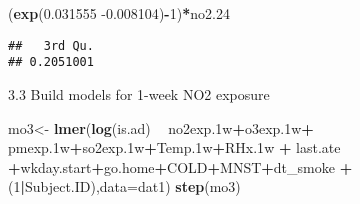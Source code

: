 \documentclass[12pt,]{article}
\newenvironment{Shaded}{\begin{snugshade}}{\end{snugshade}}
\newcommand{\DataTypeTok}[1]{\textcolor[rgb]{0.13,0.29,0.53}{#1}}
\newcommand{\DecValTok}[1]{\textcolor[rgb]{0.00,0.00,0.81}{#1}}
\newcommand{\FloatTok}[1]{\textcolor[rgb]{0.00,0.00,0.81}{#1}}
\newcommand{\KeywordTok}[1]{\textcolor[rgb]{0.13,0.29,0.53}{\textbf{#1}}}
\newcommand{\NormalTok}[1]{#1}
\newcommand{\OperatorTok}[1]{\textcolor[rgb]{0.81,0.36,0.00}{\textbf{#1}}}
\newcommand{\StringTok}[1]{\textcolor[rgb]{0.31,0.60,0.02}{#1}}
\begin{document}
\begin{Shaded}
\begin{Highlighting}[]
\NormalTok{(}\KeywordTok{exp}\NormalTok{(}\FloatTok{0.031555} \FloatTok{-0.008104}\NormalTok{)}\OperatorTok{-}\DecValTok{1}\NormalTok{)}\OperatorTok{*}\NormalTok{no2}\FloatTok{.24}
\end{Highlighting}
\end{Shaded}

\begin{verbatim}
##   3rd Qu. 
## 0.2051001
\end{verbatim}

3.3 Build models for 1-week NO2 exposure

\begin{Shaded}
\begin{Highlighting}[]
\NormalTok{mo3<-}\StringTok{ }\KeywordTok{lmer}\NormalTok{(}\KeywordTok{log}\NormalTok{(is.ad) }\OperatorTok{~}\StringTok{ }\NormalTok{no2exp}\FloatTok{.1}\NormalTok{w}\OperatorTok{+}\NormalTok{o3exp}\FloatTok{.1}\NormalTok{w}\OperatorTok{+}\StringTok{ }\NormalTok{pmexp}\FloatTok{.1}\NormalTok{w}\OperatorTok{+}\NormalTok{so2exp}\FloatTok{.1}\NormalTok{w}\OperatorTok{+}\NormalTok{Temp}\FloatTok{.1}\NormalTok{w}\OperatorTok{+}\NormalTok{RHx}\FloatTok{.1}\NormalTok{w }\OperatorTok{+}\StringTok{ }\NormalTok{last.ate }\OperatorTok{+}\NormalTok{wkday.start}\OperatorTok{+}\NormalTok{go.home}\OperatorTok{+}\NormalTok{COLD}\OperatorTok{+}\NormalTok{MNST}\OperatorTok{+}\NormalTok{dt_smoke }\OperatorTok{+}\NormalTok{(}\DecValTok{1}\OperatorTok{|}\NormalTok{Subject.ID),}\DataTypeTok{data=}\NormalTok{dat1)}
\KeywordTok{step}\NormalTok{(mo3)}
\end{Highlighting}
\end{Shaded}
\end{document}
